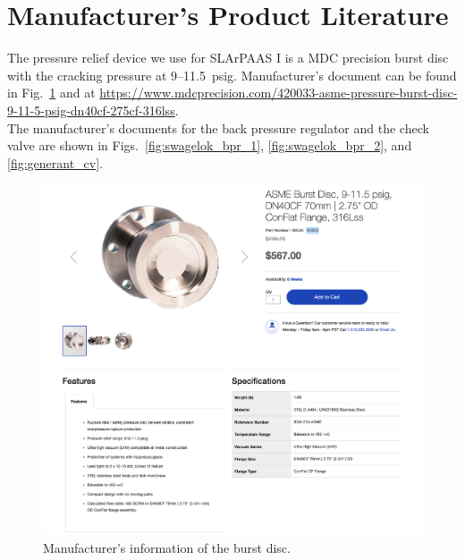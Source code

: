 \section{Manufacturer's Product Literature}
\label{app:manufacturer}

The pressure relief device we use for SLArPAAS I is a MDC precision 
burst disc with the cracking pressure at 9--11.5~psig.
Manufacturer's document can be found in Fig.~\ref{fig:mdc_burst_disc} and at
\url{https://www.mdcprecision.com/420033-asme-pressure-burst-disc-9-11-5-psig-dn40cf-275cf-316lss}.\\

The manufacturer's documents for the back pressure regulator and the check valve
are shown in Figs.~\ref{fig:swagelok_bpr_1}, \ref{fig:swagelok_bpr_2},
and \ref{fig:generant_cv}.\\

\begin{figure}[h]
    \centering
    \includegraphics[width=0.75\textheight]{fig/MDC_BurstDisc.png}
    \caption{Manufacturer's information of the burst disc.}
    \label{fig:mdc_burst_disc}
\end{figure}

